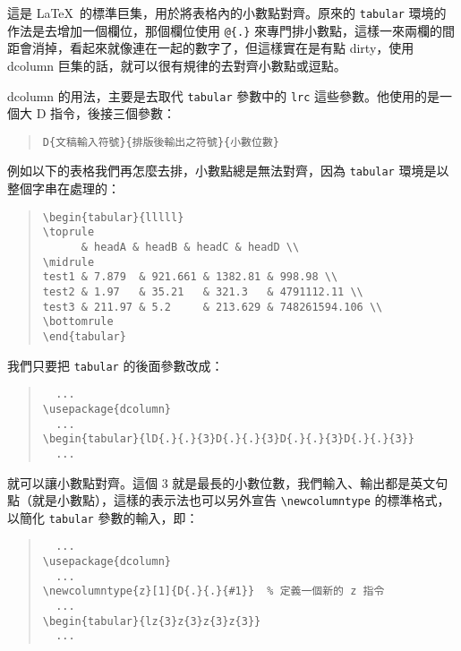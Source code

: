 這是 \LaTeX\ 的標準巨集，用於將表格內的小數點對齊。原來的 \texttt{tabular} 環境的作法是去增加一個欄位，那個欄位使用 \verb|@{.}| 來專門排小數點，這樣一來兩欄的間距會消掉，看起來就像連在一起的數字了，但這樣實在是有點 dirty，使用 \textsf{dcolumn} 巨集的話，就可以很有規律的去對齊小數點或逗點。

\textsf{dcolumn} 的用法，主要是去取代 \texttt{tabular} 參數中的 \texttt{lrc} 這些參數。他使用的是一個大 D 指令，後接三個參數：

\begin{quote}
  \begin{verbatim}
D{文稿輸入符號}{排版後輸出之符號}{小數位數}
\end{verbatim}
\end{quote}

例如以下的表格我們再怎麼去排，小數點總是無法對齊，因為 \texttt{tabular} 環境是以整個字串在處理的：

\begin{quote}
  \begin{verbatim}
\begin{tabular}{lllll}
\toprule
      & headA & headB & headC & headD \\
\midrule
test1 & 7.879  & 921.661 & 1382.81 & 998.98 \\
test2 & 1.97   & 35.21   & 321.3   & 4791112.11 \\
test3 & 211.97 & 5.2     & 213.629 & 748261594.106 \\
\bottomrule
\end{tabular}
\end{verbatim}
\end{quote}

我們只要把 \texttt{tabular} 的後面參數改成：

\begin{quote}
  \begin{verbatim}
  ...
\usepackage{dcolumn}
  ...
\begin{tabular}{lD{.}{.}{3}D{.}{.}{3}D{.}{.}{3}D{.}{.}{3}}
  ...
\end{verbatim}
\end{quote}

就可以讓小數點對齊。這個 3 就是最長的小數位數，我們輸入、輸出都是英文句點（就是小數點），這樣的表示法也可以另外宣告 \verb|\newcolumntype| 的標準格式，以簡化 \texttt{tabular} 參數的輸入，即：

\begin{quote}
  \begin{verbatim}
  ...
\usepackage{dcolumn}
  ...
\newcolumntype{z}[1]{D{.}{.}{#1}}  % 定義一個新的 z 指令
  ...
\begin{tabular}{lz{3}z{3}z{3}z{3}}
  ...
\end{verbatim}
\end{quote}

